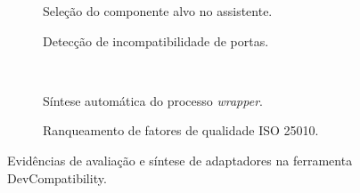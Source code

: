\begin{figure}[htbp]
    \centering
    \begin{subfigure}[b]{0.48\textwidth}
        \centering
        \caption{Seleção do componente alvo no assistente.}
        \label{fig:devcomp_select}
    \end{subfigure}
    \hfill
    \begin{subfigure}[b]{0.48\textwidth}
        \centering
        \caption{Detecção de incompatibilidade de portas.}
        \label{fig:devcomp_conn}
    \end{subfigure}
    \\[0.3cm]
    \begin{subfigure}[b]{0.48\textwidth}
        \centering
        \caption{Síntese automática do processo \textit{wrapper}.}
        \label{fig:devcomp_wrapper}
    \end{subfigure}
    \hfill
    \begin{subfigure}[b]{0.48\textwidth}
        \centering
        \caption{Ranqueamento de fatores de qualidade ISO 25010.}
        \label{fig:devcomp_ranking}
    \end{subfigure}
    \caption{Evidências de avaliação e síntese de adaptadores na ferramenta DevCompatibility.}
    \label{fig:devcomp_evidencias}
\end{figure}

